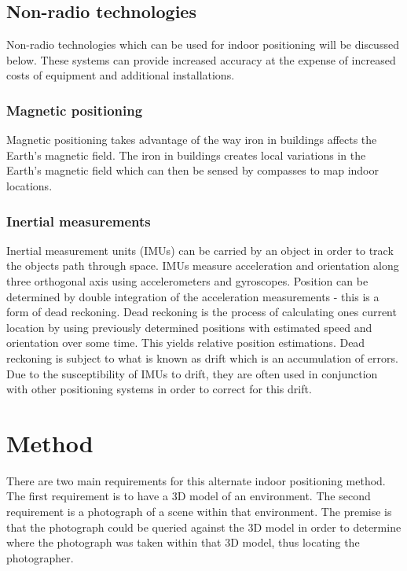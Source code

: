\documentclass[11pt,a4paper]{report}
\begin{document}
	\section{Non-radio technologies}
		Non-radio technologies which can be used for indoor positioning will be discussed below. These systems can provide increased accuracy at the expense of increased costs of equipment and additional installations.
	
	\subsection{Magnetic positioning}
		Magnetic positioning takes advantage of the way iron in buildings affects the Earth's magnetic field. The iron in buildings creates local variations in the Earth's magnetic field which can then be sensed by compasses to map indoor locations.
		\cite{supreeth_sudhakaran_geospatial_2014}
	
	\subsection{Inertial measurements}
		Inertial measurement units (IMUs) can be carried by an object in order to track the objects path through space. IMUs measure acceleration and orientation along three orthogonal axis using accelerometers and gyroscopes. Position can be determined by double integration of the acceleration measurements - this is a form of dead reckoning. Dead reckoning is the process of calculating ones current location by using previously determined positions with estimated speed and orientation over some time. This yields relative position estimations. Dead reckoning is subject to what is known as drift which is an accumulation of errors. Due to the susceptibility of IMUs to drift, they are often used in conjunction with other positioning systems in order to correct for this drift.

\newpage
\chapter{Method}
	There are two main requirements for this alternate indoor positioning method. The first requirement is to have a 3D model of an environment. The second requirement is a photograph of a scene within that environment. The premise is that the photograph could be queried against the 3D model in order to determine where the photograph was taken within that 3D model, thus locating the photographer.
	
\end{document}
